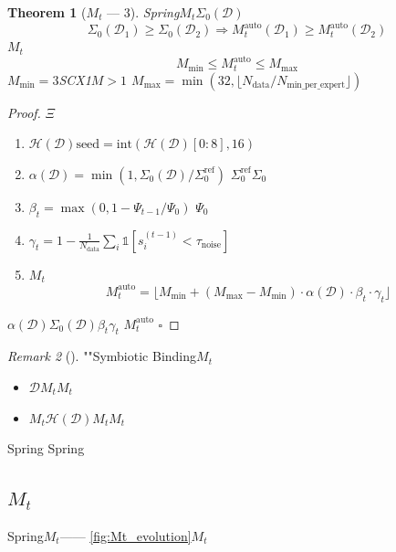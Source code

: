 \documentclass[12pt,a4paper]{article}
\newtheorem{theorem}{Theorem}[section]
\theoremstyle{remark}
\newtheorem{remark}[theorem]{Remark}
\newcommand{\D}{\mathcal{D}}
\newcommand{\Mauto}{\ensuremath{M_t^{\text{auto}}}}
\newcommand{\Lyap}{\ensuremath{\Psi}}
\newcommand{\Dhash}{\ensuremath{\mathcal{H}(\D)}}
\begin{document}
\begin{theorem}[$M_t$ — 3]\label{thm:Mt_theorem}
Spring$M_t$$\Sigma_0(\D)$
\begin{equation}\label{eq:Mt_monotonic}
    \Sigma_0(\D_1) \geq \Sigma_0(\D_2) \Longrightarrow \Mauto(\D_1) \geq \Mauto(\D_2)
\end{equation}
$M_t$
\begin{equation}\label{eq:Mt_bounds}
    M_{\min} \leq \Mauto \leq M_{\max}
\end{equation}
$M_{\min} = 3$SCX1$M>1$
$M_{\max} = \min(32, \lfloor N_{\text{data}} / N_{\text{min\_per\_expert}} \rfloor)$
\end{theorem}

\begin{proof}
$\Xi$
\begin{enumerate}[label=(\arabic*),itemsep=3pt]
    \item $\Dhash$$\text{seed} = \text{int}(\Dhash[0:8], 16)$
    \item $\alpha(\D) = \min(1, \Sigma_0(\D) / \Sigma_0^{\text{ref}})$
    $\Sigma_0^{\text{ref}}$$\Sigma_0$
    \item $\beta_t = \max(0, 1 - \Lyap_{t-1} / \Lyap_0)$
    $\Lyap_0$
    \item $\gamma_t = 1 - \frac{1}{N_{\text{data}}}\sum_i \mathbb{1}[s_i^{(t-1)} < \tau_{\text{noise}}]$
    
    \item $M_t$
    \[
    \Mauto = \lfloor M_{\min} + (M_{\max} - M_{\min}) \cdot \alpha(\D) \cdot \beta_t \cdot \gamma_t \rfloor
    \]
\end{enumerate}
$\alpha(\D)$$\Sigma_0(\D)$$\beta_t$$\gamma_t$
$\Mauto$
\hfill $\square$
\end{proof}

\begin{remark}[]
""Symbiotic Binding$M_t$\textit{}
\begin{itemize}[nosep]
    \item \textbf{} $\D$$M_t$$M_t$
    \item \textbf{} $M_t$$\Dhash$$M_t$$M_t$
\end{itemize}
Spring\textbf{}\textbf{}
Spring
\end{remark}

\subsection{$M_t$}

Spring$M_t$——
\ref{fig:Mt_evolution}$M_t$
\end{document}
